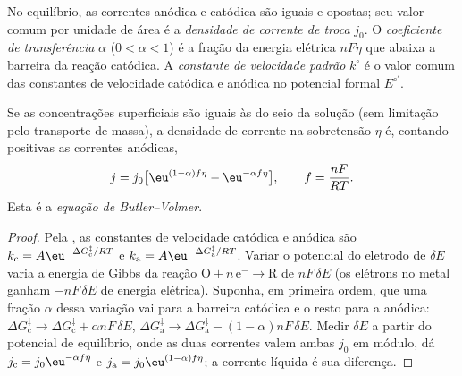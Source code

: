 \begin{definition}\label{def:b3:electrode-kinetics:exchange}
No equilíbrio, as correntes anódica e catódica são iguais e opostas; seu valor
comum por unidade de área é a \emph{densidade de corrente de troca} $j_0$. O
\emph{coeficiente de transferência} $\alpha$ ($0 < \alpha < 1$) é a fração da
energia elétrica $nF\eta$ que abaixa a barreira da reação catódica. A
\emph{constante de velocidade padrão} $k^\circ$ é o valor
comum das constantes de velocidade catódica e anódica no potencial formal $E^{\circ\prime}$.
\end{definition}

\begin{theorem}\label{thm:b3:electrode-kinetics:butler-volmer}
Se as concentrações superficiais são iguais às do seio da solução (sem limitação
pelo transporte de massa), a densidade de corrente na sobretensão $\eta$ é, contando
positivas as correntes anódicas,
\[
  j = j_0\bigl[\eu^{(1 - \alpha)f\eta} - \eu^{-\alpha f\eta}\bigr], \qquad f = \frac{nF}{RT}.
\]
Esta é a \emph{equação de Butler--Volmer}.
\end{theorem}

\begin{proof}
Pela , as constantes de velocidade catódica e anódica são
$k_{\mathrm c} = A\eu^{-\Delta G_{\mathrm c}^{\ddagger}/RT}$ e $k_{\mathrm a} = A\eu^{-\Delta G_{\mathrm a}^{\ddagger}/RT}$. Variar o potencial do eletrodo de $\delta E$
varia a energia de Gibbs da reação $\mathrm{O} + n\,\mathrm{e}^- \to \mathrm{R}$ de $nF\,\delta E$ (os elétrons
no metal ganham $-nF\,\delta E$ de energia elétrica). Suponha, em primeira ordem, que uma
fração $\alpha$ dessa variação vai para a barreira catódica e o resto para a
anódica: $\Delta G_{\mathrm c}^{\ddagger} \to \Delta G_{\mathrm c}^{\ddagger} + \alpha nF\,\delta E$, $\Delta G_{\mathrm a}^{\ddagger} \to \Delta G_{\mathrm a}^{\ddagger} - (1 - \alpha)nF\,\delta E$. Medir $\delta E$
a partir do potencial de equilíbrio, onde as duas correntes valem ambas $j_0$ em
módulo, dá $j_{\mathrm c} = j_0\eu^{-\alpha f\eta}$ e $j_{\mathrm a} = j_0\eu^{(1 - \alpha)f\eta}$; a corrente líquida é sua
diferença.
\end{proof}

